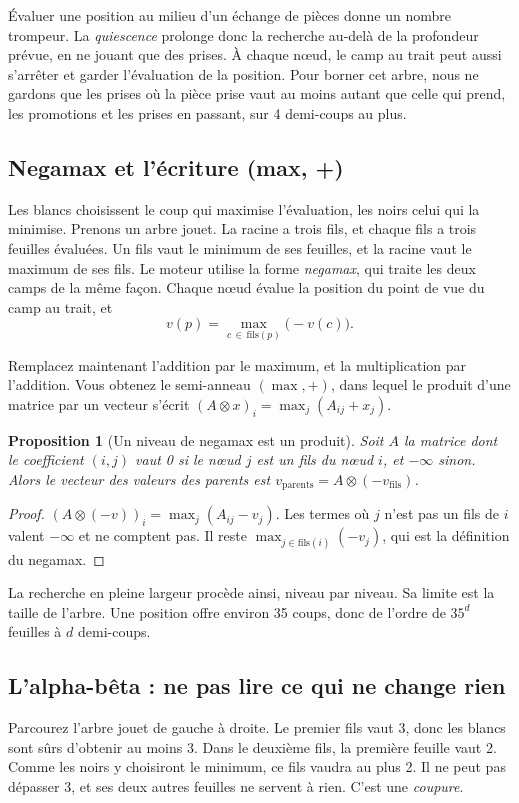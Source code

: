 \documentclass[11pt,a4paper]{article}
\theoremstyle{plain}
\newtheorem{proposition}{Proposition}
\begin{document}
Évaluer une position au milieu d'un échange de pièces donne un nombre trompeur. La
\emph{quiescence} prolonge donc la recherche au-delà de la profondeur prévue, en ne jouant que des
prises. À chaque nœud, le camp au trait peut aussi s'arrêter et garder l'évaluation de la
position. Pour borner cet arbre, nous ne gardons que les prises où la pièce prise vaut au moins
autant que celle qui prend, les promotions et les prises en passant, sur 4 demi-coups au plus.

\subsection{Negamax et l'écriture (max, +)}\label{th:maxplus}
Les blancs choisissent le coup qui maximise l'évaluation, les noirs celui qui la minimise. Prenons
un arbre jouet. La racine a trois fils, et chaque fils a trois feuilles évaluées. Un fils vaut le
minimum de ses feuilles, et la racine vaut le maximum de ses fils. Le moteur utilise la forme
\emph{negamax}, qui traite les deux camps de la même façon. Chaque nœud évalue la position du
point de vue du camp au trait, et
\[ v(p) = \max_{c\,\in\,\text{fils}(p)} \bigl(-v(c)\bigr). \]

Remplacez maintenant l'addition par le maximum, et la multiplication par l'addition. Vous obtenez
le semi-anneau $(\max, +)$, dans lequel le produit d'une matrice par un vecteur s'écrit
$(A\otimes x)_i = \max_j (A_{ij} + x_j)$.

\begin{proposition}[Un niveau de negamax est un produit]\label{prop:maxplus}
Soit $A$ la matrice dont le coefficient $(i, j)$ vaut 0 si le nœud $j$ est un fils du nœud $i$, et
$-\infty$ sinon. Alors le vecteur des valeurs des parents est
$v_{\text{parents}} = A \otimes (-v_{\text{fils}})$.
\end{proposition}
\begin{proof}
$(A \otimes (-v))_i = \max_j (A_{ij} - v_j)$. Les termes où $j$ n'est pas un fils de $i$ valent
$-\infty$ et ne comptent pas. Il reste $\max_{j \in \text{fils}(i)} (-v_j)$, qui est la
définition du negamax.
\end{proof}

La recherche en pleine largeur procède ainsi, niveau par niveau. Sa limite est la taille de
l'arbre. Une position offre environ 35 coups, donc de l'ordre de $35^d$ feuilles à $d$
demi-coups.

\subsection{L'alpha-bêta : ne pas lire ce qui ne change rien}\label{th:alphabeta}
Parcourez l'arbre jouet de gauche à droite. Le premier fils vaut 3, donc les blancs sont sûrs
d'obtenir au moins 3. Dans le deuxième fils, la première feuille vaut 2. Comme les noirs y
choisiront le minimum, ce fils vaudra au plus 2. Il ne peut pas dépasser 3, et ses deux autres
feuilles ne servent à rien. C'est une \emph{coupure}.
\end{document}
